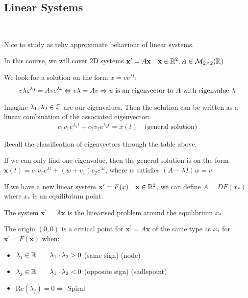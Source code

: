 \subsection{Linear Systems}\hfill\\\par
\noindent Nice to study as tehy approximate behaviour of linear systems.
\par\bigskip
\noindent In this course, we will cover 2D systems $\mathbf{x^{\prime}} = A\mathbf{x}\quad\mathbf{x}\in\mathbb{R}^2, A\in\mathcal{M}_{2\times2}(\mathbb{R})$
\par\bigskip
\noindent We look for a solution on the form $x = ve^{\lambda t}$:
\begin{equation*}
  \begin{gathered}
    v\lambda e^{\lambda}t = Ave^{\lambda t}\Leftrightarrow v\lambda = Av\Rightarrow u\text{ is an eigenvector to $A$ with eigenvalue $\lambda$}
  \end{gathered}
\end{equation*}
\par\bigskip
\noindent Imagine $\lambda_1,\lambda_2\in\mathbb{C}$ are our eigenvalues. Then the solution can be written as a linear combination of the associated eigenvector:
\begin{equation*}
  \begin{gathered}
    c_1v_1e^{\lambda_1t}+c_2v_2e^{\lambda_2t} = x(t)\quad\text{(general solution)}
  \end{gathered}
\end{equation*}
\par\bigskip
\noindent Recall the classification of eigenvectors through the table above. 
\par\bigskip
\noindent If we can only find one eigenvalue, then the general solution is on the form $\mathbf{x}(t) = c_1v_1e^{\lambda t}+(w+v_1)c_2e^{\lambda t}$, where $w$ satisfies $(A-\lambda I)w = v$ 
\par\bigskip
\noindent If we have a new linear system $\mathbf{x^{\prime}} = F(x)\quad\mathbf{x}\in\mathbb{R}^2$, we can define $A = DF(x_*)$ where $x_*$ is an equilibrium point.\par
\noindent The system $\mathbf{x^{\prime}} = A\mathbf{x}$ is the linearised problem around the equilibrium $x_*$ 
\par\bigskip
\begin{theo}[]{}
  The origin $(0,0)$ is a critical point for $\mathbf{x^{\prime}} = A\mathbf{x}$ of the same type as  $x_*$ for $\mathbf{x^{\prime}} = F(\mathbf{x})$ when:\par
  \begin{itemize}
    \item$\lambda_j\in\mathbb{R}\qquad\lambda_1\cdot\lambda_2>0$ (same sign) (node)
    \item $\lambda_j\in\mathbb{R}\qquad\lambda_1\cdot\lambda_2<0$ (opposite sign) (sadlepoint)
    \item Re$(\lambda_j) = 0\Rightarrow$ Spiral
  \end{itemize}
\end{theo}
